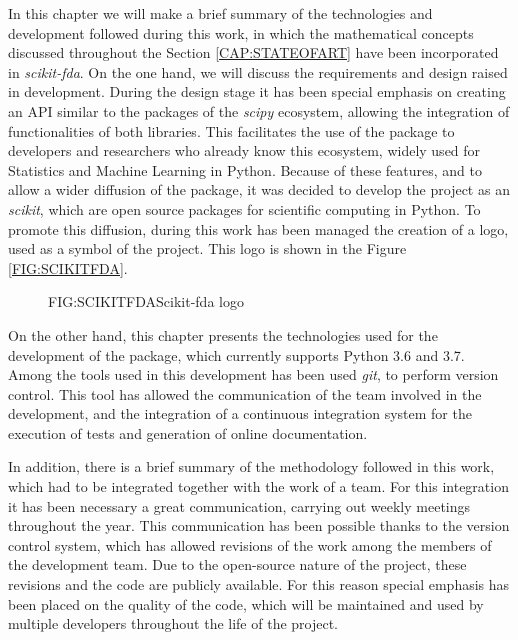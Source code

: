 
In this chapter we will make a brief summary of the technologies and development
followed during this work, in which the mathematical concepts discussed
throughout the Section \ref{CAP:STATEOFART} have been incorporated in
\textit{scikit-fda}. On the one hand, we will discuss the requirements and
design raised in development. During the design stage it has been special
emphasis on creating an \acs{API} similar to the packages of the \textit{scipy}\cite{scipy} ecosystem, allowing
the integration of functionalities of both libraries. This facilitates the use
of the package to developers and researchers who already know this ecosystem,
widely used for Statistics and Machine Learning in Python. Because of these
features, and to allow a wider diffusion of the package, it was decided to
develop the project as an \textit{scikit}, which are open source packages for
scientific computing in Python.
To promote this diffusion, during this work has been managed the creation of a
logo, used as a symbol of the project. This logo is shown in the Figure
\ref{FIG:SCIKITFDA}.

\begin{figure}[Scikit-fda logo]{FIG:SCIKITFDA}{Scikit-fda logo}
\end{figure}

On the other hand, this chapter presents the technologies used for the development of
the package, which currently supports Python 3.6 and 3.7.
Among the tools used in this development has been used \textit{git},
to perform version control. This tool has allowed the communication of the team
involved in the development, and the integration of a continuous integration
system for the execution of tests and generation of online documentation.

In addition, there is a brief summary of the methodology followed in this work,
which had to be integrated together with the work of a team.
For this integration it has been necessary a great communication,
carrying out weekly meetings throughout the year. This communication has
been possible thanks to the version control system, which has allowed
revisions of the work among the members of the development team.
Due to the open-source nature of the project, these revisions and the code
are publicly available. For this reason special emphasis has been placed on
the quality of the code, which will be maintained and used by multiple
developers throughout the life of the project.
